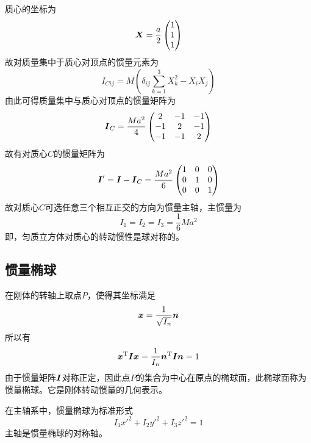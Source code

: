 \begin{solution}
质心的坐标为
\begin{equation*}
	\boldsymbol{X} = \frac{a}{2} \begin{pmatrix} 1 \\ 1 \\ 1 \end{pmatrix}
\end{equation*}
故对质量集中于质心对顶点的惯量元素为
\begin{equation*}
	I_{Cij} = M\left(\delta_{ij} \sum_{k=1}^3 X_k^2 -X_iX_j\right)
\end{equation*}
由此可得质量集中与质心对顶点的惯量矩阵为
\begin{equation*}
	\boldsymbol{I}_C = \frac{Ma^2}{4} \begin{pmatrix} 2 & -1 & -1 \\ -1 & 2 & -1 \\ -1 & -1 & 2 \end{pmatrix}
\end{equation*}
故有对质心$C$的惯量矩阵为
\begin{equation*}
	\boldsymbol{I}' = \boldsymbol{I} - \boldsymbol{I}_C = \frac{Ma^2}{6} \begin{pmatrix} 1 & 0 & 0 \\ 0 & 1 & 0 \\ 0 & 0 & 1 \end{pmatrix}
\end{equation*}
故对质心$C$可选任意三个相互正交的方向为惯量主轴，主惯量为
\begin{equation*}
	I_1 = I_2 = I_3 = \frac16 Ma^2
\end{equation*}
即，匀质立方体对质心的转动惯性是球对称的。
\end{solution}

\subsection{惯量椭球}

在刚体的转轴上取点$P$，使得其坐标满足
\begin{equation*}
	\boldsymbol{x} = \frac{1}{\sqrt{I_n}} \boldsymbol{n}
\end{equation*}
所以有
\begin{equation*}
	\boldsymbol{x}^{\mathrm{T}} \boldsymbol{I} \boldsymbol{x} = \frac{1}{I_n} \boldsymbol{n}^{\mathrm{T}} \boldsymbol{I} \boldsymbol{n} = 1
\end{equation*}
由于惯量矩阵$\boldsymbol{I}$对称正定，因此点$P$的集合为中心在原点的椭球面，此椭球面称为{\heiti 惯量椭球}。它是刚体转动惯量的几何表示。

在主轴系中，惯量椭球为标准形式
\begin{equation*}
	I_1 x'^2 + I_2 y'^2 + I_3 z'^2 = 1
\end{equation*}
主轴是惯量椭球的对称轴。

